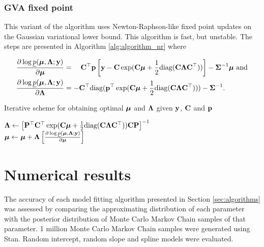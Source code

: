 \documentclass{article}[12pt]
\begin{document}
\subsubsection{GVA fixed point}


This variant of the algorithm uses Newton-Raphson-like fixed point updates on the Gaussian variational lower
bound. This algorithm is fast, but unstable. The steps are presented in Algorithm \ref{alg:algorithm_nr} where

\begin{align*}
\frac{\partial \log \underline{p}({\boldsymbol \mu}, {\boldsymbol \Lambda}; {\bf y})}{\partial {\boldsymbol\mu}} &= \quad {\bf C}^\top{\bf p} \left [{\bf y} - {\bf C}\exp({\bf C} {\boldsymbol \mu} + {\frac{1}{2}} \text{diag}({\bf C} {\boldsymbol \Lambda} {\bf C}^\top)) \right ] - {\boldsymbol \Sigma}^{-1} {\boldsymbol \mu} \text{ and}\\
\frac{\partial \log \underline{p}({\boldsymbol \mu}, {\boldsymbol \Lambda}; {\bf y})}{\partial {\boldsymbol\Lambda}} &= -{\bf C}^\top \text{diag}({\bf p}^\top \exp({\bf C} {\boldsymbol \mu} +{\frac{1}{2}} \text{diag}({\bf C} {\boldsymbol \Lambda} {\bf C}^\top))) - {\boldsymbol \Sigma}^{-1}.
\end{align*}

\begin{algorithm}
\caption[Algorithm GVA NR]{Iterative scheme for obtaining optimal ${\boldsymbol \mu}$ and ${\boldsymbol \Lambda}$
given ${\bf y}$, ${\bf C}$ and ${\bf p}$}
\label{alg:algorithm_nr}
\begin{algorithmic}
\STATE ${\boldsymbol \Lambda} \leftarrow \left [ {\bf P}^\top {\bf C}^\top \exp({\bf C} {\boldsymbol \mu} + {\frac{1}{2}} \text{diag}({\bf C} {\boldsymbol \Lambda} {\bf C}^\top)) {\bf C} {\bf P} \right ]^{-1}$ \\ [1ex]
\STATE ${\boldsymbol \mu} \leftarrow {\boldsymbol\mu} + {\boldsymbol \Lambda} \left [ \frac{\partial \log \underline{p}({\boldsymbol \mu}, {\boldsymbol \Lambda}; {\bf y})}{\partial {\boldsymbol\mu}} \right ]$
\ENDWHILE
\end{algorithmic}
\end{algorithm}


\section{Numerical results}
\label{sec:results}

The accuracy of each model fitting algorithm presented in Section \ref{sec:algorithms} was assessed by
comparing the approximating distribution of each parameter with the posterior distribution of Monte Carlo
Markov Chain samples of that parameter. 1 million Monte Carlo Markov Chain samples were generated using Stan.
Random intercept, random slope and spline models were evaluated.
\end{document}
